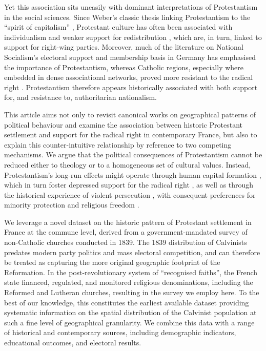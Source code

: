 \documentclass[12pt]{article}
\begin{document}
Yet this association sits uneasily with dominant interpretations of Protestantism in the social sciences. Since Weber's classic thesis linking Protestantism to the ``spirit of capitalism'' \parencite{weberProtestantEthicSpirit2012}, Protestant culture has often been associated with individualism and weaker support for redistribution \parencite{bastenWorkEthicReligion2013, schaffUnequalSpiritProtestant2025}, which are, in turn, linked to support for right-wing parties. Moreover, much of the literature on National Socialism's electoral support and membership basis in Germany has emphasised the importance of Protestantism, whereas Catholic regions, especially where embedded in dense associational networks, proved more resistant to the radical right \parencite{brownNaziVoteNational1982,oloughlinElectoralGeographyWeimar2002,BRUSTEINW1995WJTN, haffertLongTermEffectsOppression2021, kolzer2025alte}. Protestantism therefore appears historically associated with both support for, and resistance to, authoritarian nationalism.

This article aims not only to revisit canonical works on geographical patterns of political behaviour and examine the association between historic Protestant settlement and support for the radical right in contemporary France, but also to explain this counter-intuitive relationship by reference to two competing mechanisms. We argue that the political consequences of Protestantism cannot be reduced either to theology or to a homogeneous set of cultural values. Instead, Protestantism's long-run effects might operate through human capital formation \parencite{beckerWasWeberWrong2009, mokyr2017culture, eire2016reformations}, which in turn foster depressed support for the radical right \parencite{abou-chadiBrahminLeftMerchant2021}, as well as through the historical experience of violent persecution \parencite{lupuLegacyPoliticalViolence2017}, with consequent preferences for minority protection and religious freedom \parencite{braunProtectorsPluralismReligious2019, rovnyEthnicMinoritiesPolitical2024}.

We leverage a novel dataset on the historic pattern of Protestant settlement in France at the commune level, derived from a government-mandated survey of non-Catholic churches conducted in 1839. The 1839 distribution of Calvinists predates modern party politics and mass electoral competition, and can therefore be treated as capturing the more original geographic footprint of the Reformation. In the post-revolutionary system of ``recognised faiths'', the French state financed, regulated, and monitored religious denominations, including the Reformed and Lutheran churches, resulting in the survey we employ here. To the best of our knowledge, this constitutes the earliest available dataset providing systematic information on the spatial distribution of the Calvinist population at such a fine level of geographical granularity. We combine this data with a range of historical and contemporary sources, including demographic indicators, educational outcomes, and electoral results.
\end{document}
